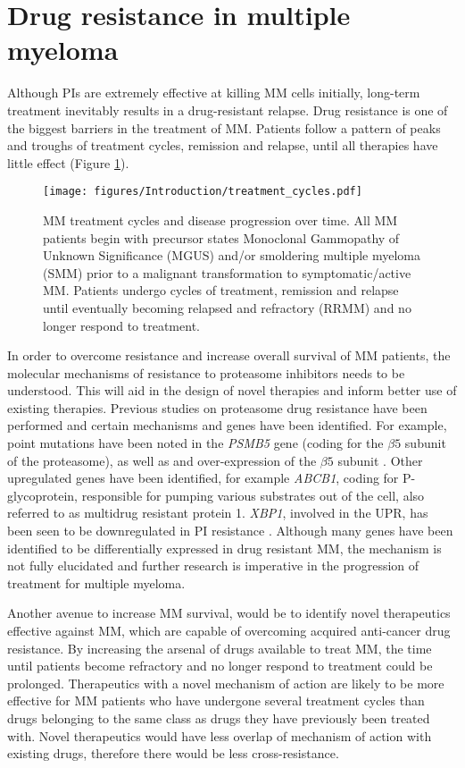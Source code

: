 \section{Drug resistance in multiple myeloma}
Although PIs are extremely effective at killing MM cells initially, long-term treatment inevitably results in a drug-resistant relapse.
Drug resistance is one of the biggest barriers in the treatment of MM.
Patients follow a pattern of peaks and troughs of treatment cycles, remission and relapse, until all therapies have little effect (Figure \ref{fig:treatment_cycles}).
\begin{figure}[htb]
\centering
\texttt{[image: figures/Introduction/treatment\_cycles.pdf]}
\caption[MM treatment cycles]{MM treatment cycles and disease progression over time.
All MM patients begin with precursor states Monoclonal Gammopathy of Unknown Significance (MGUS) and/or smoldering multiple myeloma (SMM) prior to a malignant transformation to symptomatic/active MM.
Patients undergo cycles of treatment, remission and relapse until eventually becoming relapsed and refractory (RRMM) and no longer respond to treatment.
}
\label{fig:treatment_cycles}
\end{figure}
In order to overcome resistance and increase overall survival of MM patients, the molecular mechanisms of resistance to proteasome inhibitors needs to be understood.
This  will aid in the design of novel therapies and inform better use of existing therapies.
Previous studies on proteasome drug resistance have been performed and certain mechanisms and genes have been identified.
For example, point mutations have been noted in the \textit{PSMB5} gene (coding for the $\beta5$ subunit of the proteasome), as well as and over-expression of the $\beta5$ subunit \cite{robak2018drug}.
Other upregulated genes have been identified, for example \textit{ABCB1}, coding for P-glycoprotein, responsible for pumping various substrates out of the cell, also referred to as multidrug resistant protein 1.
\textit{XBP1}, involved in the UPR, has been seen to be downregulated in PI resistance \cite{robak2018drug}.
Although many genes have been identified to be differentially expressed in drug resistant MM, the mechanism is not fully elucidated and further research is imperative in the progression of treatment for multiple myeloma.

Another avenue to increase MM survival, would be to identify novel therapeutics effective against MM, which are capable of overcoming acquired anti-cancer drug resistance.
By increasing the arsenal of drugs available to treat MM, the time until patients become refractory and no longer respond to treatment could be prolonged.
Therapeutics with a novel mechanism of action are likely to be more effective for MM patients who have undergone several treatment cycles than drugs belonging to the same class as drugs they have previously been treated with.
Novel therapeutics would have less overlap of mechanism of action with existing drugs, therefore there would be less cross-resistance.

